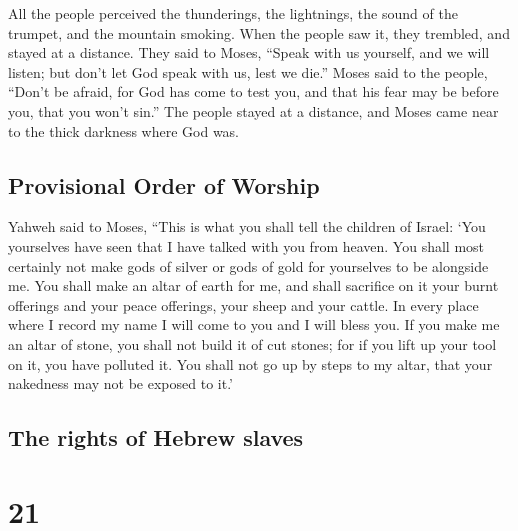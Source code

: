  All the people perceived the thunderings, the
lightnings, the sound of the trumpet, and the mountain smoking. When the
people saw it, they trembled, and stayed at a distance. 
They said to Moses, ``Speak with us yourself, and we will listen; but
don't let God speak with us, lest we die.''  Moses said
to the people, ``Don't be afraid, for God has come to test you, and that
his fear may be before you, that you won't sin.''  The
people stayed at a distance, and Moses came near to the thick darkness
where God was.

\hypertarget{provisional-order-of-worship}{%
\subsection{Provisional Order of
Worship}\label{provisional-order-of-worship}}

 Yahweh said to Moses, ``This is what you shall tell the
children of Israel: `You yourselves have seen that I have talked with
you from heaven.  You shall most certainly not make gods
of silver or gods of gold for yourselves to be alongside me.
 You shall make an altar of earth for me, and shall
sacrifice on it your burnt offerings and your peace offerings, your
sheep and your cattle. In every place where I record my name I will come
to you and I will bless you.  If you make me an altar of
stone, you shall not build it of cut stones; for if you lift up your
tool on it, you have polluted it.  You shall not go up by
steps to my altar, that your nakedness may not be exposed to it.'

\hypertarget{the-rights-of-hebrew-slaves}{%
\subsection{The rights of Hebrew
slaves}\label{the-rights-of-hebrew-slaves}}

\hypertarget{section-20}{%
\section{21}\label{section-20}}

